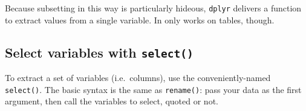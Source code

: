 \documentclass[]{book}
\newenvironment{Shaded}{}{}
\newcommand{\CommentTok}[1]{\textcolor[rgb]{0.38,0.63,0.69}{\textit{#1}}}
\newcommand{\KeywordTok}[1]{\textcolor[rgb]{0.00,0.44,0.13}{\textbf{#1}}}
\newcommand{\NormalTok}[1]{#1}
\newcommand{\OperatorTok}[1]{\textcolor[rgb]{0.40,0.40,0.40}{#1}}
\newcommand{\StringTok}[1]{\textcolor[rgb]{0.25,0.44,0.63}{#1}}
\begin{document}
Because subsetting in this way is particularly hideous, \texttt{dplyr}
delivers a function to extract values from a single variable. In only works on tables, though.

\begin{Shaded}
\end{Shaded}

\hypertarget{select-variables-with-select}{%
\subsection{\texorpdfstring{Select variables with \texttt{select()}}{Select variables with select()}}\label{select-variables-with-select}}

To extract a set of variables (i.e.~columns), use the conveniently-named
\texttt{select()}. The basic syntax is the same as \texttt{rename()}: pass your data as the
first argument, then call the variables to select, quoted or not.
\end{document}
